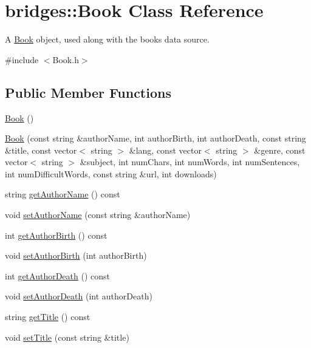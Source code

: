 \hypertarget{classbridges_1_1_book}{}\section{bridges\+:\+:Book Class Reference}
\label{classbridges_1_1_book}


A \hyperlink{classbridges_1_1_book}{Book} object, used along with the books data source.  




{\ttfamily \#include $<$Book.\+h$>$}

\subsection*{Public Member Functions}
\begin{DoxyCompactItemize}
\item 
\hyperlink{classbridges_1_1_book_abb2903c640bd263a2e077d52e12a773e}{Book} ()
\item 
\hyperlink{classbridges_1_1_book_a4256eb5015b42e511d950c45103cef63}{Book} (const string \&author\+Name, int author\+Birth, int author\+Death, const string \&title, const vector$<$ string $>$ \&lang, const vector$<$ string $>$ \&genre, const vector$<$ string $>$ \&subject, int num\+Chars, int num\+Words, int num\+Sentences, int num\+Difficult\+Words, const string \&url, int downloads)
\item 
string \hyperlink{classbridges_1_1_book_ac6f0f8249f91502fe9dff0cbdb7d823a}{get\+Author\+Name} () const 
\item 
void \hyperlink{classbridges_1_1_book_a4ca756815b519a0a4d1ae5d3b21aa2d2}{set\+Author\+Name} (const string \&author\+Name)
\item 
int \hyperlink{classbridges_1_1_book_a027e0894b79bb778282ed44efccb78cc}{get\+Author\+Birth} () const 
\item 
void \hyperlink{classbridges_1_1_book_adca4d6766fa0068e23926ae95ed8411f}{set\+Author\+Birth} (int author\+Birth)
\item 
int \hyperlink{classbridges_1_1_book_ae53c1ee954d10e0409e4e8c16fe44035}{get\+Author\+Death} () const 
\item 
void \hyperlink{classbridges_1_1_book_a044ad1b1b6418d7545c6f957b2757bcd}{set\+Author\+Death} (int author\+Death)
\item 
string \hyperlink{classbridges_1_1_book_a06296dbad347d4c81feed3faa8fc1114}{get\+Title} () const 
\item 
void \hyperlink{classbridges_1_1_book_a68e4e04db8915b6baff809c46e6d1df9}{set\+Title} (const string \&title)

\end{DoxyCompactItemize}
